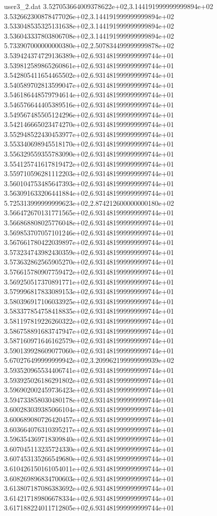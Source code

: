 \begin{filecontents}{user3_2.dat}
3.527053664009378622e+02,3.144191999999999894e+02
3.532662300878477026e+02,3.144191999999999894e+02
3.533048535325131638e+02,3.144191999999999894e+02
3.536043337803806708e+02,3.144191999999999894e+02
5.733907000000000380e+02,2.507834499999999878e+02
3.539424374729136389e+02,6.931481999999999744e+01
3.539812589865260861e+02,6.931481999999999744e+01
3.542805411654465502e+02,6.931481999999999744e+01
3.540589702813599047e+02,6.931481999999999744e+01
3.546186448579794614e+02,6.931481999999999744e+01
3.546576644405389516e+02,6.931481999999999744e+01
3.549567485505124296e+02,6.931481999999999744e+01
3.542146665023474270e+02,6.931481999999999744e+01
3.552948522430453977e+02,6.931481999999999744e+01
3.553340698945518170e+02,6.931481999999999744e+01
3.556329559355783090e+02,6.931481999999999744e+01
3.554125741617819472e+02,6.931481999999999744e+01
3.559710596281112203e+02,6.931481999999999744e+01
3.560104753485647393e+02,6.931481999999999744e+01
3.563091633206441884e+02,6.931481999999999744e+01
5.725313999999999623e+02,2.874212600000000180e+02
3.566472670131771565e+02,6.931481999999999744e+01
3.566868808025776048e+02,6.931481999999999744e+01
3.569853707057101246e+02,6.931481999999999744e+01
3.567661780422039897e+02,6.931481999999999744e+01
3.573234743982430359e+02,6.931481999999999744e+01
3.573632862565905270e+02,6.931481999999999744e+01
3.576615780907759472e+02,6.931481999999999744e+01
3.569250517370891771e+02,6.931481999999999744e+01
3.579996817833089153e+02,6.931481999999999744e+01
3.580396917106033925e+02,6.931481999999999744e+01
3.583377854758418835e+02,6.931481999999999744e+01
3.581197819226260322e+02,6.931481999999999744e+01
3.586758891683747947e+02,6.931481999999999744e+01
3.587160971646162579e+02,6.931481999999999744e+01
3.590139928609077060e+02,6.931481999999999744e+01
5.670276499999999942e+02,3.209962199999999939e+02
3.593520965534406741e+02,6.931481999999999744e+01
3.593925026186291802e+02,6.931481999999999744e+01
3.596902002459736423e+02,6.931481999999999744e+01
3.594733858030480178e+02,6.931481999999999744e+01
3.600283039385066104e+02,6.931481999999999744e+01
3.600689080726420457e+02,6.931481999999999744e+01
3.603664076310395217e+02,6.931481999999999744e+01
3.596354369718309840e+02,6.931481999999999744e+01
3.607045113235724330e+02,6.931481999999999744e+01
3.607453135266549680e+02,6.931481999999999744e+01
3.610426150161054011e+02,6.931481999999999744e+01
3.608269896834700603e+02,6.931481999999999744e+01
3.613807187086383692e+02,6.931481999999999744e+01
3.614217189806678334e+02,6.931481999999999744e+01
3.617188224011712805e+02,6.931481999999999744e+01

\end{filecontents}
